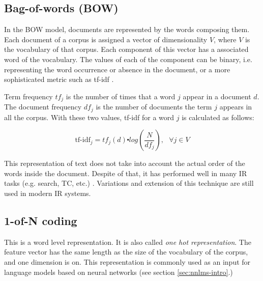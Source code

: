 
 \subsection{Bag-of-words (BOW)}
 \label{sec:rel_bow}

In the \ac{BOW} model, documents are represented by the words composing them.
Each document of a corpus is assigned a vector of dimensionality $V$, where $V$ is the
vocabulary of that corpus. Each component of this vector has a associated word of
the vocabulary. The values of each of the component can be binary, i.e. representing the
word occurrence or absence in the document, or a more sophisticated metric
such as \ac{tf-idf} \cite{Salton88term-weightingapproaches}.

Term frequency $tf_j$  is the number of times that a word $j$ appear in a
document $d$. The document frequency  $df_{j}$  is the number of documents
the term $j$ appears in all the corpus.  With these two values,  \ac{tf-idf}  for a  word $j$ is  calculated as follows:

\begin{equation*}
  \label{eq:tf-idf}
  \text{tf-idf}_{j}=tf_{j}(d)\centerdot log(\frac{N}{df_{j}}),\,\,\,\,\forall
  j \in V
\end{equation*}

This representation of text does not take  into account the actual order of the words inside the document. Despite
of that, it has  performed well in many \ac{IR} tasks (e.g. search, \ac{TC},
etc.) \cite{Sebastiani02}. Variations and extension of this technique are
still used in modern \ac{IR} systems.

 \subsection{1-of-N coding}
 \label{sec:1_of_coding}

 This is a word level representation. It is also called \textit{one hot
   representation}. The feature vector has the same length as the size of the
 vocabulary of the corpus, and  one dimension is on.  This representation is
 commonly used as an input for language models based on neural networks (see
 section \ref{sec:nnlms-intro}.)


